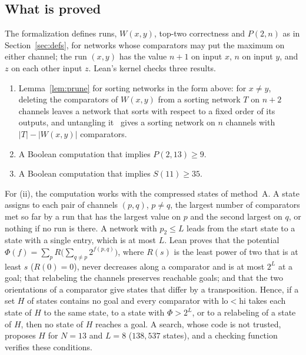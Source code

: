 \subsection{What is proved}
The formalization defines runs, $W(x,y)$, top-two correctness and $P(2,n)$ as in Section~\ref{sec:defs}, for
networks whose comparators may put the maximum on either channel; the run $(x,y)$ has the value $n+1$ on input
$x$, $n$ on input $y$, and $z$ on each other input $z$. Lean's kernel checks three results.
\begin{enumerate}[label=(\roman*)]
\item Lemma~\ref{lem:prune} for sorting networks in the form above: for $x\ne y$, deleting the comparators of
$W(x,y)$ from a sorting network $T$ on $n+2$ channels leaves a network that sorts with respect to a fixed order
of its outputs, and untangling it~\cite[Exercise~5.3.4--16]{Knu98} gives a sorting network on $n$ channels
with $|T|-|W(x,y)|$ comparators.
\item A Boolean computation that implies $P(2,13)\ge9$.
\item A Boolean computation that implies $S(11)\ge35$.
\end{enumerate}

For (ii), the computation works with the compressed states of method~A. A state assigns to each pair of
channels $(p,q)$, $p\ne q$, the largest number of comparators met so far by a run that has the largest value
on $p$ and the second largest on $q$, or nothing if no run is there. A network with $p_2\le L$ leads from the
start state to a state with a single entry, which is at most $L$. Lean proves that the potential
$\Phi(f)=\sum_pR\bigl(\sum_{q\ne p}2^{f(p,q)}\bigr)$, where $R(s)$ is the least power of two that is at least $s$
($R(0)=0$), never decreases along a comparator and is at most $2^L$ at a goal; that relabeling the channels
preserves reachable goals; and that the two orientations of a comparator give states that differ by a
transposition. Hence, if a set $H$ of states contains no goal and every comparator with $\mathrm{lo}<\mathrm{hi}$
takes each state of $H$ to the same state, to a state with $\Phi>2^L$, or to a relabeling of a state of $H$,
then no state of $H$ reaches a goal. A search, whose code is not trusted, proposes $H$ for $N=13$ and $L=8$
($138{,}537$ states), and a checking function verifies these conditions.

